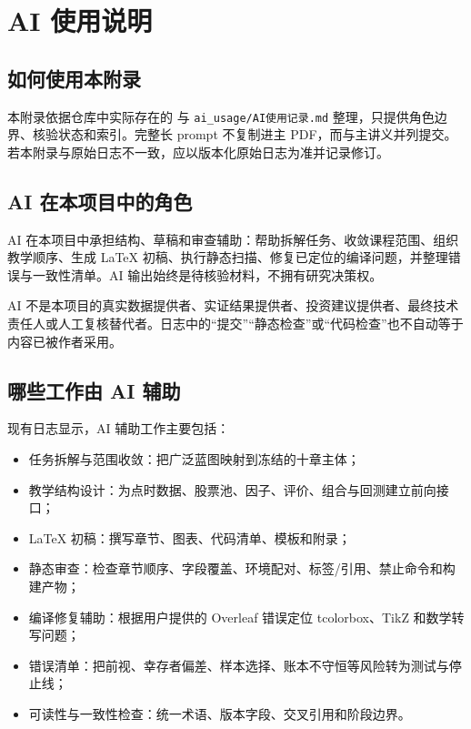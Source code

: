 \chapter{AI 使用说明}
\label{app:ai-usage}

\section*{如何使用本附录}

本附录依据仓库中实际存在的  与 \texttt{ai\_usage/AI使用记录.md} 整理，只提供角色边界、核验状态和索引。完整长 prompt 不复制进主 PDF，而与主讲义并列提交。若本附录与原始日志不一致，应以版本化原始日志为准并记录修订。

\section{AI 在本项目中的角色}

AI 在本项目中承担结构、草稿和审查辅助：帮助拆解任务、收敛课程范围、组织教学顺序、生成 LaTeX 初稿、执行静态扫描、修复已定位的编译问题，并整理错误与一致性清单。AI 输出始终是待核验材料，不拥有研究决策权。

AI 不是本项目的真实数据提供者、实证结果提供者、投资建议提供者、最终技术责任人或人工复核替代者。日志中的“提交”“静态检查”或“代码检查”也不自动等于内容已被作者采用。

\section{哪些工作由 AI 辅助}

现有日志显示，AI 辅助工作主要包括：

\begin{itemize}
  \item 任务拆解与范围收敛：把广泛蓝图映射到冻结的十章主体；
  \item 教学结构设计：为点时数据、股票池、因子、评价、组合与回测建立前向接口；
  \item LaTeX 初稿：撰写章节、图表、代码清单、模板和附录；
  \item 静态审查：检查章节顺序、字段覆盖、环境配对、标签/引用、禁止命令和构建产物；
  \item 编译修复辅助：根据用户提供的 Overleaf 错误定位 tcolorbox、TikZ 和数学转写问题；
  \item 错误清单：把前视、幸存者偏差、样本选择、账本不守恒等风险转为测试与停止线；
  \item 可读性与一致性检查：统一术语、版本字段、交叉引用和阶段边界。
\end{itemize}


